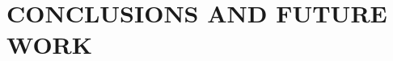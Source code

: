 \documentclass[letterpaper, 10 pt, conference]{ieeeconf}  %
\begin{document}
   


\section{CONCLUSIONS AND FUTURE WORK}


\addtolength{\textheight}{-12cm}   %




\end{document}
